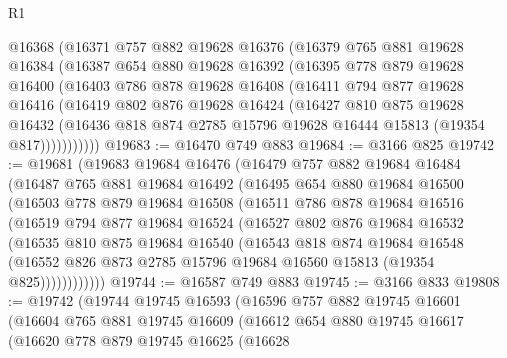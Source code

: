 \begin{lexlean}{R1}
\begin{coremodule}
      @16368
      (@16371
        @757
        @882
        @19628
        @16376
        (@16379
          @765
          @881
          @19628
          @16384
          (@16387
            @654
            @880
            @19628
            @16392
            (@16395
              @778
              @879
              @19628
              @16400
              (@16403
                @786
                @878
                @19628
                @16408
                (@16411
                  @794
                  @877
                  @19628
                  @16416
                  (@16419
                    @802
                    @876
                    @19628
                    @16424
                    (@16427
                      @810
                      @875
                      @19628
                      @16432
                      (@16436 @818 @874 @2785 @15796 @19628 @16444 @15813 (@19354 @817)))))))))))
@19683 := @16470 @749 @883
@19684 := @3166 @825
@19742 := @19681
    (@19683
      @19684
      @16476
      (@16479
        @757
        @882
        @19684
        @16484
        (@16487
          @765
          @881
          @19684
          @16492
          (@16495
            @654
            @880
            @19684
            @16500
            (@16503
              @778
              @879
              @19684
              @16508
              (@16511
                @786
                @878
                @19684
                @16516
                (@16519
                  @794
                  @877
                  @19684
                  @16524
                  (@16527
                    @802
                    @876
                    @19684
                    @16532
                    (@16535
                      @810
                      @875
                      @19684
                      @16540
                      (@16543
                        @818
                        @874
                        @19684
                        @16548
                        (@16552 @826 @873 @2785 @15796 @19684 @16560 @15813 (@19354 @825))))))))))))
@19744 := @16587 @749 @883
@19745 := @3166 @833
@19808 := @19742
    (@19744
      @19745
      @16593
      (@16596
        @757
        @882
        @19745
        @16601
        (@16604
          @765
          @881
          @19745
          @16609
          (@16612
            @654
            @880
            @19745
            @16617
            (@16620
              @778
              @879
              @19745
              @16625
              (@16628

\end{coremodule}
\end{lexlean}
